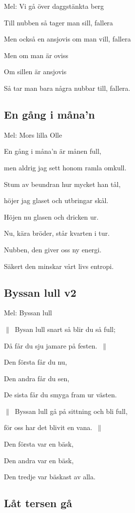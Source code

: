 Mel: Vi gå över daggstänkta berg\bigskip

Till nubben så tager man sill, fallera

Men också en ansjovis om man vill, fallera

Men om man är oviss

Om sillen är ansjovis

Så tar man bara några nubbar till, fallera.

\subsection{\textbf{En gång i måna’n}}

Mel: Mors lilla Olle\bigskip

En gång i måna’n är månen full,

men aldrig jag sett honom ramla omkull.

Stum av beundran hur mycket han tål,

höjer jag glaset och utbringar skål.

Höjen nu glasen och dricken ur.

Nu, kära bröder, står kvarten i tur.

Nubben, den giver oss ny energi.

Säkert den minskar vårt livs entropi.

\subsection{\textbf{Byssan lull v2}}

Mel: Byssan lull\bigskip

$\|\:$ Bysan lull snart så blir du så full;

Då får du sju jamare på festen. $\:\|$

Den första får du nu,

Den andra får du sen,

De sista får du smyga fram ur västen.

$\|\:$ Byssan lull gå på sittning och bli full,

för oss har det blivit en vana. $\:\|$

Den första var en bäsk,

Den andra var en bäsk,

Den tredje var bäskast av alla.

\subsection{\textbf{Låt tersen gå}}


